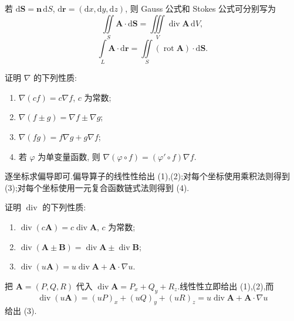 \begin{remark}
    若 $\mathrm{d}\bm S=\bm n\,\mathrm{d}S$, $\mathrm{d}\bm r=(\mathrm{d}x,\mathrm{d}y,\mathrm{d}z)$, 则 Gauss 公式和 Stokes 公式可分别写为
    \[
        \displaystyle\iint\limits_S\bm A\cdot\mathrm{d}\bm S
        =\iiint\limits_V\operatorname{div}\bm A\,\mathrm{d}V,
    \]
    \[
        \displaystyle\int\limits_L\bm A\cdot\mathrm{d}\bm r
        =\iint\limits_S(\operatorname{rot}\bm A)\cdot\mathrm{d}\bm S.
    \]
\end{remark}

\begin{example}
    证明 $\nabla$ 的下列性质:
    \begin{enumerate}
        \item $\nabla(cf)=c\nabla f$, $c$ 为常数;
        \item $\nabla(f\pm g)=\nabla f\pm\nabla g$;
        \item $\nabla(fg)=f\nabla g+g\nabla f$;
        \item 若 $\varphi$ 为单变量函数, 则 $\nabla(\varphi\circ f)=(\varphi'\circ f)\nabla f$.
    \end{enumerate}
\end{example}
\exampleblank

\begin{solution}
    逐坐标求偏导即可.偏导算子的线性性给出 (1),(2);对每个坐标使用乘积法则得到 (3);对每个坐标使用一元复合函数链式法则得到 (4).
\end{solution}

\begin{example}
    证明 $\operatorname{div}$ 的下列性质:
    \begin{enumerate}
        \item $\operatorname{div}(c\bm A)=c\operatorname{div}\bm A$, $c$ 为常数;
        \item $\operatorname{div}(\bm A\pm\bm B)=\operatorname{div}\bm A\pm\operatorname{div}\bm B$;
        \item $\operatorname{div}(u\bm A)=u\operatorname{div}\bm A+\bm A\cdot\nabla u$.
    \end{enumerate}
\end{example}
\exampleblank

\begin{solution}
    把 $\bm A=(P,Q,R)$ 代入 $\operatorname{div}\bm A=P_x+Q_y+R_z$.线性性立即给出 (1),(2),而
    \[
        \operatorname{div}(u\bm A)=(uP)_x+(uQ)_y+(uR)_z
        =u\operatorname{div}\bm A+\bm A\cdot\nabla u
    \]
    给出 (3).
\end{solution}

